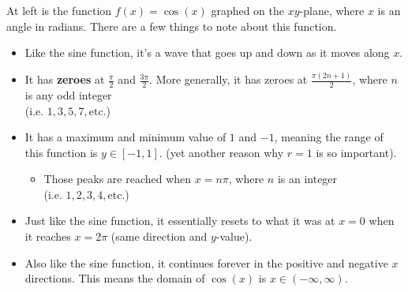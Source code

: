 \begin{center}
    \begin{minipage}[c]{0.33\linewidth}
    \end{minipage}
    \begin{minipage}[c]{0.66\textwidth}
        At left is the function $f(x) = \cos(x)$ graphed on the $xy$-plane, where $x$ is an angle in radians. There are a few things to note about this function.
        \begin{itemize}
            \item Like the sine function, it's a wave that goes up and down as it moves along $x$.
            \item It has \textbf{zeroes} at $\frac{\pi}{2}$ and $\frac{3\pi}{2}$. More generally, it has zeroes at $\frac{\pi(2n + 1)}{2}$, where $n$ is any odd integer\\
            (i.e. $1,3,5,7,\text{etc.}$)
        \end{itemize}
    \end{minipage}
\end{center}
\begin{itemize}
    \item It has a maximum and minimum value of $1$ and $-1$, meaning the range of this function is $y \in [-1, 1]$. (yet another reason why $r = 1$ is so important).
    \begin{itemize}
        \item Those peaks are reached when $x = n\pi$, where $n$ is an integer\\(i.e. $1,2,3,4,\text{etc.}$)
    \end{itemize}
    \item Just like the sine function, it essentially resets to what it was at $x = 0$ when it reaches $x = 2\pi$ (same direction and $y$-value).
    \item Also like the sine function, it continues forever in the positive and negative $x$ directions. This means the domain of $\cos(x)$ is $x \in (-\infty, \infty)$.
\end{itemize}
